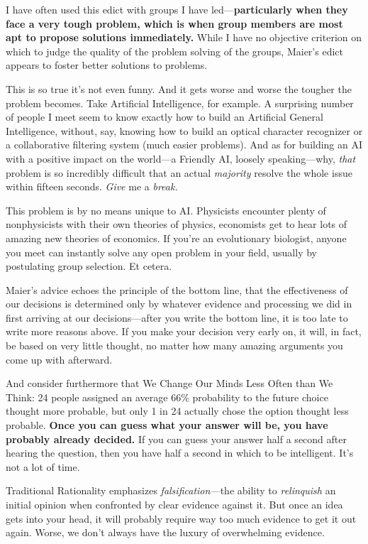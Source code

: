 {
 I have often used this edict with groups I have
led---\textbf{particularly when they face a very tough problem, which
is when group members are most apt to propose solutions immediately.}
While I have no objective criterion on which to judge the quality of
the problem solving of the groups, Maier's edict
appears to foster better solutions to problems.}

{
 This is so true it's not even funny. And it gets
worse and worse the tougher the problem becomes. Take Artificial
Intelligence, for example. A surprising number of people I meet seem to
know exactly how to build an Artificial General Intelligence, without,
say, knowing how to build an optical character recognizer or a
collaborative filtering system (much easier problems). And as for
building an AI with a positive impact on the world---a Friendly AI,
loosely speaking---why, \textit{that} problem is so incredibly
difficult that an actual \textit{majority} resolve the whole issue
within fifteen seconds. \textit{Give} me a \textit{break.}}

{
 This problem is by no means unique to AI. Physicists encounter
plenty of nonphysicists with their own theories of physics, economists
get to hear lots of amazing new theories of economics. If
you're an evolutionary biologist, anyone you meet can
instantly solve any open problem in your field, usually by postulating
group selection. Et cetera.}

{
 Maier's advice echoes the principle of the bottom
line, that the effectiveness of our decisions is determined only by
whatever evidence and processing we did in first arriving at our
decisions---after you write the bottom line, it is too late to write
more reasons above. If you make your decision very early on, it will,
in fact, be based on very little thought, no matter how many amazing
arguments you come up with afterward.}

{
 And consider furthermore that We Change Our Minds Less Often than
We Think: 24 people assigned an average 66\% probability to the future
choice thought more probable, but only 1 in 24 actually chose the
option thought less probable. \textbf{Once you can guess what your
answer will be, you have probably already decided.} If you can guess
your answer half a second after hearing the question, then you have
half a second in which to be intelligent. It's not a
lot of time.}

{
 Traditional Rationality emphasizes \textit{falsification---}the
ability to \textit{relinquish} an initial opinion when confronted by
clear evidence against it. But once an idea gets into your head, it
will probably require way too much evidence to get it out again. Worse,
we don't always have the luxury of overwhelming
evidence.}

